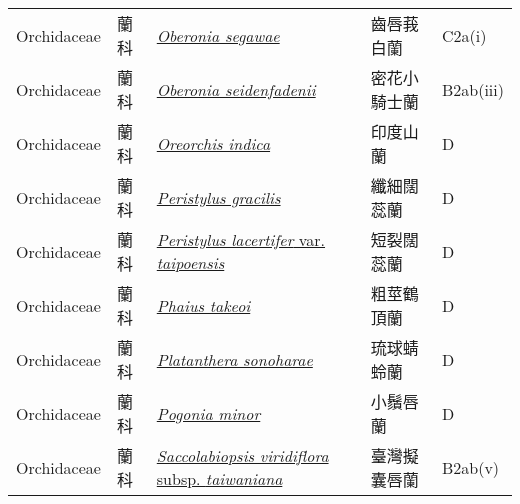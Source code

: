 {\begin{longtable}{p{2.5cm}p{2.5cm}p{4.5cm}p{2.5cm}p{3cm}}
    Orchidaceae & 蘭科 & \href{http://www.theplantlist.org/tpl1.1/search?q=Oberonia+segawae}{\textit{Oberonia segawae} } & 齒唇莪白蘭 & C2a(i) \index{Oberonia@\textit{Oberonia}!segawae@\textit{segawae}}  \index{齒唇莪白蘭} \\
    Orchidaceae & 蘭科 & \href{http://www.theplantlist.org/tpl1.1/search?q=Oberonia+seidenfadenii}{\textit{Oberonia seidenfadenii} } & 密花小騎士蘭 & B2ab(iii) \index{Oberonia@\textit{Oberonia}!seidenfadenii@\textit{seidenfadenii}}  \index{密花小騎士蘭} \\
    Orchidaceae & 蘭科 & \href{http://www.theplantlist.org/tpl1.1/search?q=Oreorchis+indica}{\textit{Oreorchis indica} } & 印度山蘭 & D \index{Oreorchis@\textit{Oreorchis}!indica@\textit{indica}}  \index{印度山蘭} \\
    Orchidaceae & 蘭科 & \href{http://www.theplantlist.org/tpl1.1/search?q=Peristylus+gracilis}{\textit{Peristylus gracilis} } & 纖細闊蕊蘭 & D \index{Peristylus@\textit{Peristylus}!gracilis@\textit{gracilis}}  \index{纖細闊蕊蘭} \\
    Orchidaceae & 蘭科 & \href{http://www.theplantlist.org/tpl1.1/search?q=Peristylus+lacertifer+var.+taipoensis}{\textit{Peristylus lacertifer} var. \textit{taipoensis} } & 短裂闊蕊蘭 & D \index{Peristylus@\textit{Peristylus}!lacertifer@\textit{lacertifer}!var. taipoensis@var. \textit{taipoensis}}  \index{短裂闊蕊蘭} \\
    Orchidaceae & 蘭科 & \href{http://www.theplantlist.org/tpl1.1/search?q=Phaius+takeoi}{\textit{Phaius takeoi} } & 粗莖鶴頂蘭 & D \index{Phaius@\textit{Phaius}!takeoi@\textit{takeoi}}  \index{粗莖鶴頂蘭} \\
    Orchidaceae & 蘭科 & \href{http://www.theplantlist.org/tpl1.1/search?q=Platanthera+sonoharae}{\textit{Platanthera sonoharae} } & 琉球蜻蛉蘭 & D \index{Platanthera@\textit{Platanthera}!sonoharae@\textit{sonoharae}}  \index{琉球蜻蛉蘭} \\
    Orchidaceae & 蘭科 & \href{http://www.theplantlist.org/tpl1.1/search?q=Pogonia+minor}{\textit{Pogonia minor} } & 小鬚唇蘭 & D \index{Pogonia@\textit{Pogonia}!minor@\textit{minor}}  \index{小鬚唇蘭} \\
    Orchidaceae & 蘭科 & \href{http://www.theplantlist.org/tpl1.1/search?q=Saccolabiopsis+viridiflora+subsp.+taiwaniana}{\textit{Saccolabiopsis viridiflora} subsp. \textit{taiwaniana} } & 臺灣擬囊唇蘭 & B2ab(v) \index{Saccolabiopsis@\textit{Saccolabiopsis}!viridiflora@\textit{viridiflora}!subsp. taiwaniana@subsp. \textit{taiwaniana}}  \index{臺灣擬囊唇蘭} \\

\end{longtable}}
